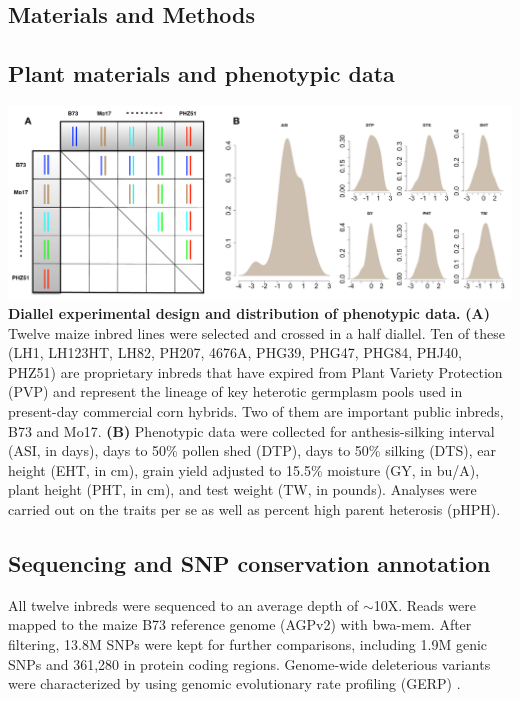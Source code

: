 \documentclass[a0,portrait]{a0poster}
\newcommand{\jri}[1]{\textcolor{blue}{ \emph{\scriptsize  #1}} }
\begin{document}
\begin{multicols}{2}

\section*{Materials and Methods}

\subsection*{Plant materials and phenotypic data}
\begin{center}\vspace{1cm}
\includegraphics[width=0.8\linewidth]{pvp.pdf}
{\color{black} \textbf{Diallel experimental design and distribution of phenotypic data.}
\textbf{(A)} Twelve maize inbred lines were selected and crossed in a half diallel. Ten of these (LH1, LH123HT, LH82, PH207, 4676A, PHG39, PHG47, PHG84, PHJ40, PHZ51) are proprietary inbreds that have expired from Plant Variety Protection (PVP) and represent the lineage of key heterotic germplasm pools used in present-day commercial corn hybrids. Two of them are important public inbreds, B73 and Mo17. \textbf{(B)} Phenotypic data were collected for anthesis-silking interval (ASI, in days), days to 50\% pollen shed (DTP), days to 50\% silking (DTS), ear height (EHT, in cm), grain yield adjusted to 15.5\% moisture (GY, in bu/A), plant height (PHT, in cm), and test weight (TW, in pounds). Analyses were carried out on the traits per se as well as percent high parent heterosis (pHPH).
}
\end{center}\vspace{1cm}

\subsection*{Sequencing and SNP conservation annotation}
All twelve inbreds were sequenced to an average depth of $\sim$10X. Reads were mapped to the maize B73 reference genome (AGPv2) with bwa-mem.  After filtering, 13.8M SNPs were kept for further comparisons, including 1.9M genic SNPs and 361,280 in protein coding regions. Genome-wide deleterious variants were characterized by using genomic evolutionary rate profiling (GERP) \citep{Davydov2010}. %


\end{multicols}
\end{document}
